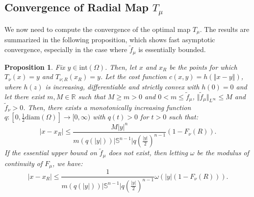 \documentclass{amsart}
\theoremstyle{lemma}
\newtheorem{proposition}[theorem]{Proposition}
\newtheorem{remark}[theorem]{Remark}
\theoremstyle{remark}
\begin{document}



\subsection{Convergence of Radial Map $T_{\mu}$}\label{sec:inverseradialmap}

We now need to compute the convergence of the optimal map $T_{\mu}$. The results are summarized in the following proposition, which shows fast asymptotic convergence, especially in the case where $\tilde{f}_{\mu}$ is essentially bounded.

\begin{proposition}\label{prop:inversemapradial}
Fix $y \in \text{int}(\Omega)$. Then, let $x$ and $x_R$ be the points for which $T_{\nu}(x) = y$ and $T_{\nu;R}(x_R) = y$. Let the cost function $c(x,y) = h(\left\Vert x - y \right\Vert)$, where $h(z)$ is increasing, differentiable and strictly convex with $h(0) = 0$ and let there exist $m, M \in \mathbb{R}$ such that $M\geq m> 0$ and $0<m \leq \tilde{f}_{\mu}$, $\Vert \tilde{f}_{\mu} \Vert_{L^{\infty}} \leq M$ and $\tilde{f}_{\nu}>0$. Then, there exists a monotonically increasing function $q: [0, \frac{1}{2} \text{diam}(\Omega)] \rightarrow [0, \infty)$ with $q(t)>0$ for $t>0$ such that:
\begin{equation}
\left\vert x - x_R \right\vert \leq \frac{M \vert y \vert^n}{m(q(\vert y \vert)) \vert \mathbb{S}^{n-1} \vert q\left( \frac{\vert y \vert}{2} \right)^{n-1}} (1 - F_{\nu}(R)).
\end{equation}
If the essential upper bound on $\tilde{f}_{\mu}$ does not exist, then letting $\omega$ be the modulus of continuity of $F_{\mu}$, we have:
\begin{equation}
 \left\vert x - x_{R} \right\vert \leq \frac{1}{m(q(\vert y \vert)) \vert \mathbb{S}^{n-1} \vert q\left( \frac{\vert y \vert}{2} \right)^{n-1}} \omega(\vert y \vert (1 - F_{\nu}(R))).
\end{equation}
\end{proposition}
\end{document}
